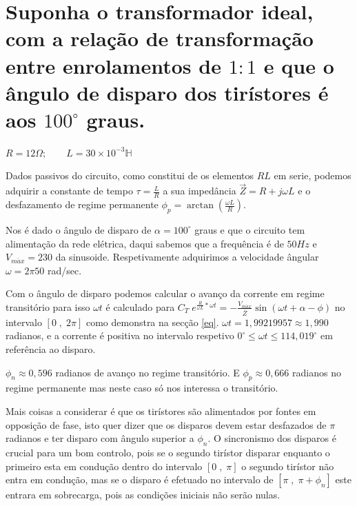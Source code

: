 \documentclass[titlepage, a4paper, 11pt, reqno, openany]{article}%
\begin{document}
\section{\textnormal{Suponha o transformador ideal, com a rela\c{c}\~{a}o de transforma\c{c}\~{a}o entre enrolamentos de $1:1$ e 
que o \^{a}ngulo de disparo dos tir\'{i}stores \'{e} aos $100^{\circ}$ graus.}}\par
%
$R=12\Omega; \qquad L=30\times 10^{-3}\mathbb{H}$\par
Dados passivos do circuito, como constitui de os elementos $RL$ em serie, podemos adquirir a constante de tempo $\tau=\frac{L}{R}$ a sua imped\^{a}ncia $\overrightarrow{Z}=R + j \omega L$ e o desfazamento de regime permanente $\phi_p=\arctan(\frac{\omega L}{R})$.\par
%
Nos \'{e} dado o \^{a}ngulo de disparo de $\alpha=100^{\circ}$ graus e que o circuito tem alimenta\c{c}\~{a}o da rede el\'{e}trica, daqui sabemos que a frequ\^{e}ncia \'{e} de $50 Hz$ e $V_{m\acute{a}x}=230$ da sinusoide. Respetivamente adquirimos a velocidade \^{a}ngular $\omega=2\pi50$ rad/sec.\par
%
Com o \^{a}ngulo de disparo podemos calcular o avan\c{c}o da corrente em regime transit\'{o}rio para isso $\omega t$ \'{e} calculado para $C_T \; e^{\frac{R}{\omega L}*\omega t} = - \frac{V_{m\acute{a}x}}{\overline{Z}}\sin(\omega t + \alpha - \phi)$ 
 no intervalo $[0 \; , \; 2\pi]$ como demonstra na sec\c{c}\~{a}o \ref{eq}. 
$\omega t=1,99219957 \approx 1,990$ radianos, e a corrente \'{e} positiva no intervalo respetivo $0^{\circ} \leq \omega t \leq 114,019^{\circ}$ em refer\^{e}ncia ao disparo.\par
$\phi_n \approx 0,596$ radianos de avan\c{c}o no regime transit\'{o}rio. E $\phi_p \approx 0,666$ radianos no regime permanente mas neste caso s\'{o} nos interessa o transit\'{o}rio.\par
Mais coisas a considerar \'{e} que os tir\'{i}stores s\~{a}o alimentados por fontes em opposi\c{c}\~{a}o de fase, isto quer dizer que os disparos devem estar desfazados de $\pi$ radianos e ter disparo com \^{a}ngulo superior a $\phi_n$.
O sincronismo dos disparos \'{e} crucial para um bom controlo, pois se o segundo tir\'{i}stor disparar enquanto o primeiro esta em condu\c{c}\~{a}o dentro do intervalo $[0 \; , \; \pi]$ o segundo tir\'{i}stor n\~{a}o entra em condu\c{c}\~{a}o, mas se o disparo \'{e} efetuado no intervalo de $[\pi \; , \; \pi+\phi_n]$ este entrara em sobrecarga, pois as condi\c{c}\~{o}es iniciais n\~{a}o ser\~{a}o nulas.\par
\end{document}
